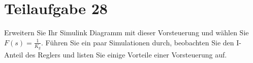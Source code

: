 \section{Teilaufgabe 28}
\begin{aufgabe}
    Erweitern Sie Ihr Simulink Diagramm mit dieser Vorsteuerung und wählen Sie 
    $F(s) = \frac{1}{K_g}$. Führen Sie ein paar Simulationen durch, beobachten 
    Sie den I-Anteil des Reglers und listen Sie einige Vorteile einer 
    Vorsteuerung auf.
\end{aufgabe}
